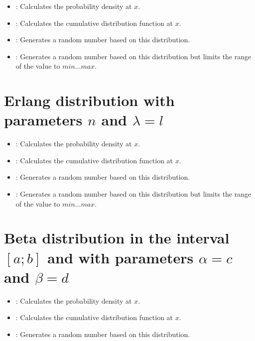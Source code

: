 \begin{itemize}

\item
{}:
Calculates the probability density at $x$.

\item
{}:
Calculates the cumulative distribution function at $x$.

\item
{}:
Generates a random number based on this distribution.

\item
{}:
Generates a random number based on this distribution but limits the range of the value to $min\ldots max$.

\end{itemize}



\section{Erlang distribution with parameters \texorpdfstring{$n$}{n} and \texorpdfstring{$\lambda=l$}{l}}

\begin{itemize}

\item
{}:
Calculates the probability density at $x$.

\item
{}:
Calculates the cumulative distribution function at $x$.

\item
{}:
Generates a random number based on this distribution.

\item
{}:
Generates a random number based on this distribution but limits the range of the value to $min\ldots max$.

\end{itemize}



\section{Beta distribution in the interval \texorpdfstring{$[a;b]$}{[a;b]} and with parameters \texorpdfstring{$\alpha=c$}{c} and \texorpdfstring{$\beta=d$}{d}}

\begin{itemize}

\item
{}:
Calculates the probability density at $x$.

\item
{}:
Calculates the cumulative distribution function at $x$.

\item
{}:
Generates a random number based on this distribution.

\end{itemize}



